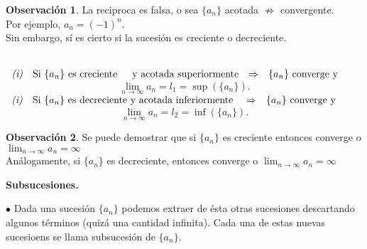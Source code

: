 \documentclass{article}
\theoremstyle{definition}
\newtheorem*{obs}{Observación}
\theoremstyle{remark}
\begin{document}
\begin{obs}
  La reciproca es falsa, o sea $\{a_n\}$ acotada $\not\Rightarrow$ convergente. \\
  Por ejemplo, $a_n=(-1)^n$. \\
  Sin embargo, sí es cierto si la sucesión es creciente o decreciente.
\end{obs}
\begin{teo} \; \\

  $\begin{array}{llcl}
    \emph{(i)} & \text{Si } \{a_n\} \text{ es creciente \;\;\; y acotada superiormente} & \Rightarrow & \{a_n\} \text{ converge y}
    \end{array}$ 
    \[ \lim_{n \to \infty}{a_n}=l_1=\sup\left(\{a_n\}\right).\] 
    $\begin{array}{llcl}
    \emph{(i)} & \text{Si } \{a_n\} \text{ es decreciente y acotada inferiormente } & \Rightarrow & \{a_n\} \text{ converge y}
    \end{array}$ 
    \[ \lim_{n \to \infty}{a_n}=l_2=\inf\left(\{a_n\}\right).\] 
 \end{teo}

\begin{obs}
Se puede demostrar que si $\{a_n\}$ es creciente entonces converge o $\lim_{n \to \infty}{a_n}=\infty$ \\
Análogamente, si $\{a_n\}$ es decreciente, entonces converge o $\lim_{n \to \infty}{a_n}=\infty$
\end{obs}


\begin{center}
\textbf{Subsucesiones.}
\end{center}

$\bullet$ Dada una sucesión $\{a_n\}$ podemos extraer de ésta otras sucesiones descartando algunos términos (quizá una cantidad infinita). Cada una de estas nuevas sucesioens se llama subsucesión de $\{a_n\}$. 
\end{document}
